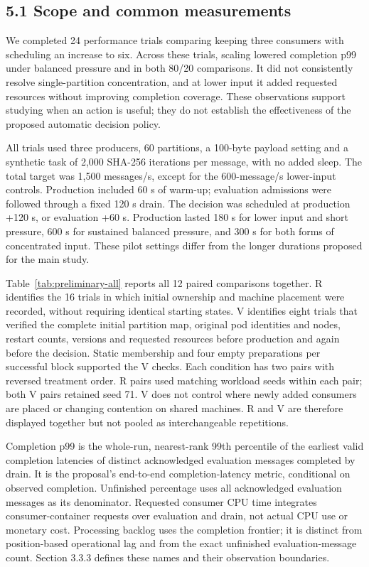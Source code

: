 
\subsection*{5.1 Scope and common measurements}

We completed 24 performance trials comparing keeping three consumers with scheduling an increase to six. Across these trials, scaling lowered completion p99 under balanced pressure and in both 80/20 comparisons. It did not consistently resolve single-partition concentration, and at lower input it added requested resources without improving completion coverage. These observations support studying when an action is useful; they do not establish the effectiveness of the proposed automatic decision policy.

All trials used three producers, 60 partitions, a 100-byte payload setting and a synthetic task of 2,000 SHA-256 iterations per message, with no added sleep. The total target was 1,500 messages/s, except for the 600-message/s lower-input controls. Production included 60 s of warm-up; evaluation admissions were followed through a fixed 120 s drain. The decision was scheduled at production +120 s, or evaluation +60 s. Production lasted 180 s for lower input and short pressure, 600 s for sustained balanced pressure, and 300 s for both forms of concentrated input. These pilot settings differ from the longer durations proposed for the main study.

Table~\ref{tab:preliminary-all} reports all 12 paired comparisons together. R identifies the 16 trials in which initial ownership and machine placement were recorded, without requiring identical starting states. V identifies eight trials that verified the complete initial partition map, original pod identities and nodes, restart counts, versions and requested resources before production and again before the decision. Static membership and four empty preparations per successful block supported the V checks. Each condition has two pairs with reversed treatment order. R pairs used matching workload seeds within each pair; both V pairs retained seed 71. V does not control where newly added consumers are placed or changing contention on shared machines. R and V are therefore displayed together but not pooled as interchangeable repetitions.

Completion p99 is the whole-run, nearest-rank 99th percentile of the earliest valid completion latencies of distinct acknowledged evaluation messages completed by drain. It is the proposal's end-to-end completion-latency metric, conditional on observed completion. Unfinished percentage uses all acknowledged evaluation messages as its denominator. Requested consumer CPU time integrates consumer-container requests over evaluation and drain, not actual CPU use or monetary cost. Processing backlog uses the completion frontier; it is distinct from position-based operational lag and from the exact unfinished evaluation-message count. Section 3.3.3 defines these names and their observation boundaries.

